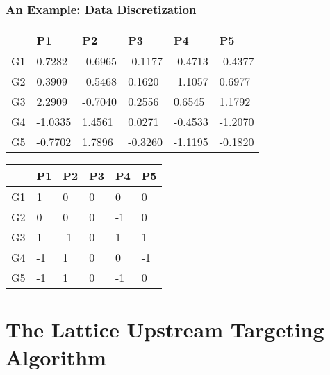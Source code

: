\documentclass[
	11pt, %
]{beamer}
\begin{document}
\begin{frame}
	\frametitle{An Example: Data Discretization}
	\begin{table}
        \begin{tabular}{|l||l|l|l|l|l|}
        \hline
         & P1 & P2 & P3 & P4 & P5 \\ \hline \hline
        G1 & 0.7282 & -0.6965 & -0.1177 & -0.4713 & -0.4377 \\ \hline
        G2 & 0.3909 & -0.5468 & 0.1620 & -1.1057 & 0.6977 \\ \hline
        G3 & 2.2909 & -0.7040 & 0.2556 & 0.6545 & 1.1792 \\ \hline
        G4 & -1.0335 & 1.4561 & 0.0271 & -0.4533 & -1.2070 \\ \hline
        G5 & -0.7702 & 1.7896 & -0.3260 & -1.1195 & -0.1820 \\ \hline
    \end{tabular}
    \end{table}
    \pause
	\begin{table}
        \begin{tabular}{|l||l|l|l|l|l|}
        \hline
         & P1 & P2 & P3 & P4 & P5 \\ \hline \hline
        G1 & 1 & 0 & 0 & 0 & 0 \\ \hline
        G2 & 0 & 0 & 0 & -1 & 0 \\ \hline
        G3 & 1 & -1 & 0 & 1 & 1 \\ \hline
        G4 & -1 & 1 & 0 & 0 & -1 \\ \hline
        G5 & -1 & 1 & 0 & -1 & 0 \\ \hline
    \end{tabular}
    \end{table}
\end{frame}


\section{The Lattice Upstream Targeting Algorithm}
\end{document}
